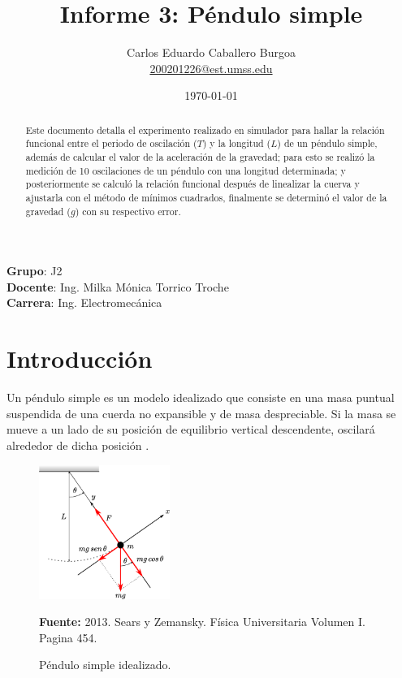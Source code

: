 \documentclass[letter,11pt]{article}
\title{Informe 3: Péndulo simple}
\author{Carlos Eduardo Caballero Burgoa \\
    \small{\href{mailto:200201226@est.umss.edu}{200201226@est.umss.edu}}
}
\date{\today}
\newcommand{\source}[1]{\vspace{-11pt} \caption*{\small{\textbf{Fuente:} {#1}}}}
\begin{document}
\maketitle
\begin{center}
    \textbf{Grupo}: J2\\
    \textbf{Docente}: Ing. Milka Mónica Torrico Troche\\
    \textbf{Carrera}: Ing. Electromecánica
\end{center}

\begin{abstract}
    Este documento detalla el experimento realizado en simulador para hallar 
    la relación funcional entre el periodo de oscilación ($T$) y la longitud
    ($L$) de un péndulo simple, además de calcular el valor de la aceleración
    de la gravedad; para esto se realizó la medición de 10 oscilaciones de un
    péndulo con una longitud determinada; y posteriormente se calculó la
    relación funcional después de linealizar la cuerva y ajustarla con el método
    de mínimos cuadrados, finalmente se determinó el valor de la gravedad ($g$)
    con su respectivo error.
\end{abstract}

\section{Introducción}

Un péndulo simple es un modelo idealizado que consiste en una masa puntual
suspendida de una cuerda no expansible y de masa despreciable. Si la masa se
mueve a un lado de su posición de equilibrio vertical descendente, oscilará
alrededor de dicha posición \cite{Sears}.

\begin{figure}
\centering
\includegraphics[width=0.38\textwidth]{resources/f1.eps}
\caption{Péndulo simple idealizado.}
\label{figura1}
\source{2013. Sears y Zemansky. Física Universitaria Volumen I. Pagina 454.}
\end{figure}
\end{document}
